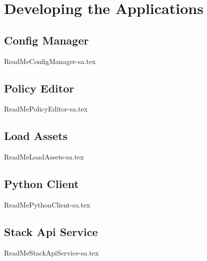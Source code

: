 
\chapter{Developing the Applications}
\label{intro04} %


\section{Config Manager}
{ReadMeConfigManager-sa.tex}

\section{Policy Editor}
{ReadMePolicyEditor-sa.tex}

\section{Load Assets}
{ReadMeLoadAssets-sa.tex}

\section{Python Client}
{ReadMePythonClient-sa.tex}

\section{Stack Api Service}
{ReadMeStackApiService-sa.tex}

